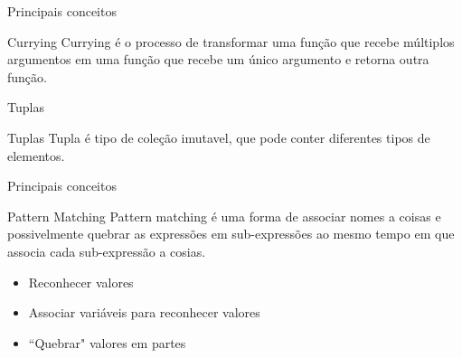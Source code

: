 \begin{frame}{Principais conceitos}
	\begin{block}{Currying}
		Currying é o processo de transformar uma função que recebe múltiplos
		argumentos em uma função que recebe um único argumento e retorna outra função.
	\end{block}
	
	\begin{center}
		
	\end{center}
\end{frame}

\begin{frame}{Tuplas}
	\begin{block}{Tuplas}
		Tupla é tipo de coleção imutavel, que pode conter diferentes tipos de
		elementos.
	\end{block}
	
	\begin{center}
		 
	\end{center}
\end{frame}
 
\begin{frame}{Principais conceitos}
	\begin{block}{Pattern Matching}
	Pattern matching é uma forma de associar nomes a coisas e possivelmente quebrar as expressões
	em sub-expressões ao mesmo tempo em que associa cada sub-expressão a cosias.
		\begin{itemize}
			\item Reconhecer valores
			\item Associar variáveis para reconhecer valores
			\item ``Quebrar" valores em partes
		\end{itemize}
	\end{block}
	
	\begin{center}
		
	\end{center}
\end{frame}
